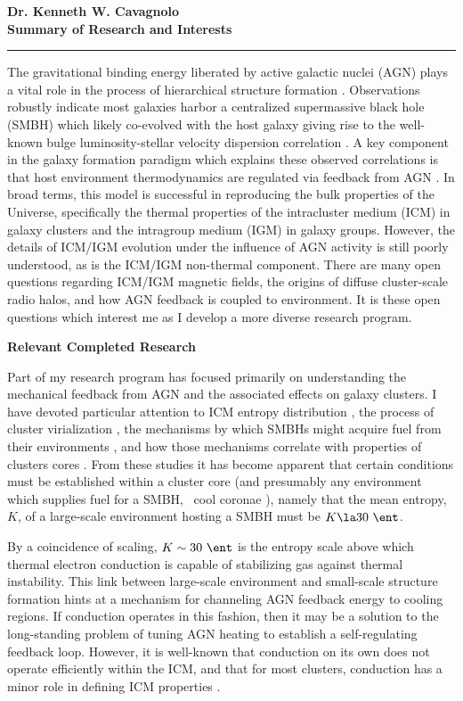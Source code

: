 \documentclass[11pt]{article}
\begin{document}
\begin{center}
{\large \textbf{Dr. Kenneth W. Cavagnolo\\Summary of Research and Interests}}
\rule{17cm}{2pt}
\end{center}
\normalsize

The gravitational binding energy liberated by active galactic nuclei
(AGN) plays a vital role in the process of hierarchical structure
formation \cite[\eg][]{perseus1, croton06, bower06, saro06, sijacki07,
  birzan08}. Observations robustly indicate most galaxies harbor a
centralized supermassive black hole (SMBH) which likely co-evolved
with the host galaxy giving rise to the well-known bulge
luminosity-stellar velocity dispersion correlation
\cite{1995ARA&A..33..581K, magorrian}. A key component in the galaxy
formation paradigm which explains these observed correlations is that
host environment thermodynamics are regulated via feedback from AGN
\cite{2002MNRAS.333..145N, mcnamrev}. In broad terms, this model is
successful in reproducing the bulk properties of the Universe,
specifically the thermal properties of the intracluster medium (ICM)
in galaxy clusters and the intragroup medium (IGM) in galaxy
groups. However, the details of ICM/IGM evolution under the influence
of AGN activity is still poorly understood, as is the ICM/IGM
non-thermal component. There are many open questions regarding ICM/IGM
magnetic fields, the origins of diffuse cluster-scale radio halos, and
how AGN feedback is coupled to environment. It is these open questions
which interest me as I develop a more diverse research program.

{\bf{Relevant Completed Research}}

Part of my research program has focused primarily on understanding the
mechanical feedback from AGN and the associated effects on galaxy
clusters. I have devoted particular attention to ICM entropy
distribution \cite{accept}, the process of cluster virialization
\cite{xrayband}, the mechanisms by which SMBHs might acquire fuel from
their environments \cite{conduction}, and how those mechanisms
correlate with properties of clusters cores \cite{haradent}. From
these studies it has become apparent that certain conditions must be
established within a cluster core (and presumably any environment
which supplies fuel for a SMBH, \eg\ cool coronae \cite{coronae}),
namely that the mean entropy, $K$, of a large-scale environment
hosting a SMBH must be $K \la 30~\ent$.

By a coincidence of scaling, $K \sim 30~\ent$ is the entropy scale
above which thermal electron conduction is capable of stabilizing gas
against thermal instability. This link between large-scale environment
and small-scale structure formation hints at a mechanism for
channeling AGN feedback energy to cooling regions. If conduction
operates in this fashion, then it may be a solution to the
long-standing problem of tuning AGN heating to establish a
self-regulating feedback loop. However, it is well-known that
conduction on its own does not operate efficiently within the ICM, and
that for most clusters, conduction has a minor role in defining ICM
properties \cite{2001ApJ...562L.129N, 2002ApJ...581..223R,
  2004MNRAS.347.1130V, dunn08}.
\end{document}
